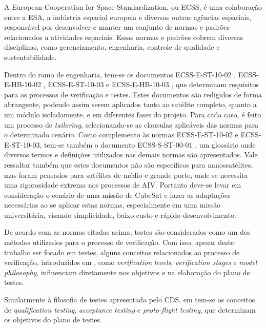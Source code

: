 A European Cooperation for Space Standardization, ou \gls{ECSS}, é uma colaboração entre a \gls{ESA}, a indústria espacial europeia e diversas outras agências espaciais, responsável por desenvolver e manter um conjunto de normas e padrões relacionados a atividades espaciais. Essas normas e padrões cobrem diversas disciplinas, como gerenciamento, engenharia, controle de qualidade e sustentabilidade.

Dentro do ramo de engenharia, tem-se os documentos ECSS-E-ST-10-02 \cite{ecss-e-st-10-02}, ECSS-E-HB-10-02 \cite{ecss-e-hb-10-02}, ECSS-E-ST-10-03 \cite{ecss-e-st-10-03} e ECSS-E-HB-10-03 \cite{ecss-e-hb-10-03}, que determinam requisitos para os processos de verificação e testes.
Estes documentos são redigidos de forma abrangente, podendo assim serem aplicados tanto ao satélite completo, quanto a um módulo isoladamente, e em diferentes fases do projeto.
Para cada caso, é feito um processo de \textit{tailoring}, selecionando-se as clausulas aplicáveis das normas para o determinado cenário.
Como complemento às normas ECSS-E-ST-10-02 e ECSS-E-ST-10-03, tem-se também o documento ECSS-S-ST-00-01 \cite{ecss-s-st-00-01}, um glossário onde diversos termos e definições utilizados nas demais normas são apresentados.
Vale ressaltar também que estes documentos não são específicos para nanossatélites, mas foram pensados para satélites de médio e grande porte, onde se necessita uma rigorosidade extrema nos processos de \gls{AIV}.
Portanto deve-se levar em consideração o cenário de uma missão de CubeSat e fazer as adaptações necessárias ao se aplicar estas normas, especialmente em uma missão universitária, visando simplicidade, baixo custo e rápido desenvolvimento.

De acordo com as normas citadas acima, testes são considerados como um dos métodos utilizados para o processo de verificação.
Com isso, apesar deste trabalho ser focado em testes, alguns conceitos relacionados ao processo de verificação, introduzidos em \textcite{ecss-e-st-10-02}, como \textit{verification levels}, \textit{verification stages} e \textit{model philosophy}, influenciam diretamente nos objetivos e na elaboração do plano de testes.

Similarmente à filosofia de testes apresentada pelo \gls{CDS}, em \textcite{ecss-e-st-10-03} tem-se os conceitos de \textit{qualification testing}, \textit{acceptance testing} e \textit{proto-flight testing}, que determinam os objetivos do plano de testes.

